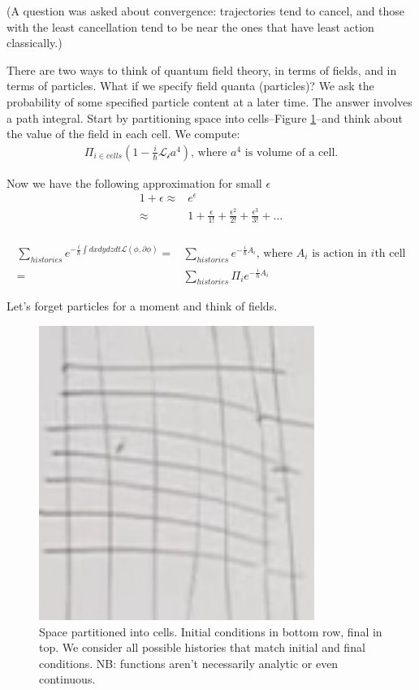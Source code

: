 \documentclass[]{article}
\begin{document}
(A question was asked about convergence: trajectories tend to cancel, and those with the least cancellation tend to be near the ones that have least action classically.)

There are two ways to think of quantum field theory, in terms of fields, and in terms of particles. What if we specify field quanta (particles)? We ask the probability of some specified particle content at a later time. The answer involves a path integral. Start by partitioning space into cells--Figure \ref{fig:path-integral2}--and think about the value of the field in each cell. We compute:
\begin{align*}
	\Pi_{i\in cells}(1-\frac{i}{\hslash} \mathcal{L_i}a^4) \text{, where $a^4$ is volume of a cell.}
\end{align*}
 
Now we have the following approximation for small $\epsilon$
\begin{align*}
	1 + \epsilon \approx &e^\epsilon\\
	\approx& 1 + \frac{\epsilon}{1!} + \frac{\epsilon^2}{2!}  + \frac{\epsilon^3}{3!} +...\\
\end{align*}

\begin{align*}
	\sum_{histories} e^{-\frac{i}{\hslash} \int dx dy dz dt\mathcal{L}(\phi,\partial \phi) } =& \sum_{histories} e^{-\frac{i}{\hslash} A_i } \text{, where $A_i$ is action in $i$th cell}\\
	=& \sum_{histories} \Pi_i e^{-\frac{i}{\hslash} A_i }
\end{align*}

Let's forget particles for a moment and think of fields.

\begin{figure}[H]
	\caption[Space partitioned into cells]{Space partitioned into cells. Initial conditions in bottom row, final in top. We consider all possible histories that match initial and final conditions. NB: functions aren't necessarily analytic or even continuous.}\label{fig:path-integral2}
	\includegraphics[width=0.8\textwidth]{path-integral2}
\end{figure}
\end{document}
